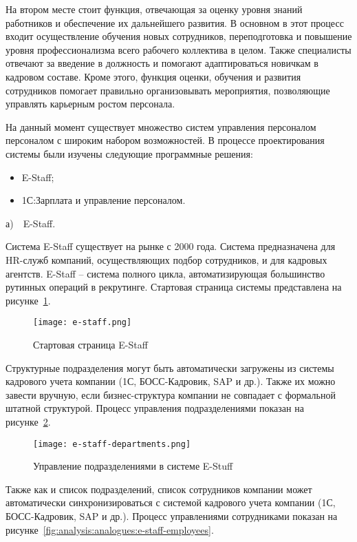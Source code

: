 На втором месте стоит функция, отвечающая за оценку уровня знаний работников и обеспечение их дальнейшего развития.
В основном в этот процесс входит осуществление обучения новых сотрудников, переподготовка и повышение уровня
профессионализма всего рабочего коллектива в целом. Также специалисты отвечают за введение в должность и помогают
адаптироваться новичкам в кадровом составе. Кроме этого, функция оценки, обучения и развития сотрудников помогает
правильно организовывать мероприятия, позволяющие управлять карьерным ростом персонала.

На данный момент существует множество систем управления персоналом персоналом с широким набором возможностей. В
процессе проектирования системы были изучены следующие программные решения:
\begin{itemize}
	\item E-Staff;
	\item 1С:Зарплата и управление персоналом.
\end{itemize}

а)~~E-Staff.

Система E-Staff существует на рынке с 2000 года. Система предназначена для HR-служб компаний, осуществляющих подбор
сотрудников, и для кадровых агентств. E-Staff -- система полного цикла, автоматизирующая большинство рутинных операций
в рекрутинге. Стартовая страница системы представлена на рисунке~\ref{fig:analysis:analogues:e-staff}.
\pagebreak

\begin{figure}
	\centering
	\texttt{[image: e-staff.png]} 
	\caption{Стартовая страница E-Staff}
	\label{fig:analysis:analogues:e-staff}
\end{figure}

Структурные подразделения могут быть автоматически загружены из системы кадрового учета компании
(1С, БОСС-Кадровик, SAP и др.). Также их можно завести вручную, если бизнес-структура компании не совпадает с
формальной штатной структурой. Процесс управления подразделениями показан на рисунке~\ref{fig:analysis:analogues:e-staff-departments}.

\begin{figure}[!h]
	\centering
	\texttt{[image: e-staff-departments.png]} 
	\caption{Управление подразделениями в системе E-Stuff}
	\label{fig:analysis:analogues:e-staff-departments}
\end{figure}

Также как и список подразделений, список сотрудников компании может автоматически синхронизироваться с системой
кадрового учета компании (1С, БОСС-Кадровик, SAP и др.). Процесс управлениями сотрудниками показан на рисунке~\ref{fig:analysis:analogues:e-staff-employees}.

